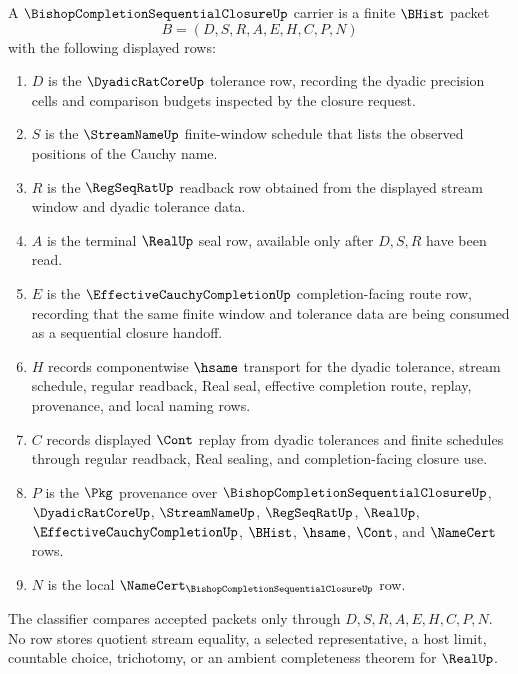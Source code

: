 \begin{definition}
\label{def:bishop-completion-sequential-closure-carrier}
A $\BishopCompletionSequentialClosureUp$ carrier is a finite $\BHist$ packet
$$
B=(D,S,R,A,E,H,C,P,N)
$$
with the following displayed rows:
\begin{enumerate}
\item $D$ is the $\DyadicRatCoreUp$ tolerance row, recording the dyadic precision cells and comparison budgets inspected by the closure request.
\item $S$ is the $\StreamNameUp$ finite-window schedule that lists the observed positions of the Cauchy name.
\item $R$ is the $\RegSeqRatUp$ readback row obtained from the displayed stream window and dyadic tolerance data.
\item $A$ is the terminal $\RealUp$ seal row, available only after $D,S,R$ have been read.
\item $E$ is the $\EffectiveCauchyCompletionUp$ completion-facing route row, recording that the same finite window and tolerance data are being consumed as a sequential closure handoff.
\item $H$ records componentwise $\hsame$ transport for the dyadic tolerance, stream schedule, regular readback, Real seal, effective completion route, replay, provenance, and local naming rows.
\item $C$ records displayed $\Cont$ replay from dyadic tolerances and finite schedules through regular readback, Real sealing, and completion-facing closure use.
\item $P$ is the $\Pkg$ provenance over $\BishopCompletionSequentialClosureUp$, $\DyadicRatCoreUp$, $\StreamNameUp$, $\RegSeqRatUp$, $\RealUp$, $\EffectiveCauchyCompletionUp$, $\BHist$, $\hsame$, $\Cont$, and $\NameCert$ rows.
\item $N$ is the local $\NameCert_{\BishopCompletionSequentialClosureUp}$ row.
\end{enumerate}
The classifier compares accepted packets only through $D,S,R,A,E,H,C,P,N$. No row stores quotient stream equality, a selected representative, a host limit, countable choice, trichotomy, or an ambient completeness theorem for $\RealUp$.
\end{definition}

